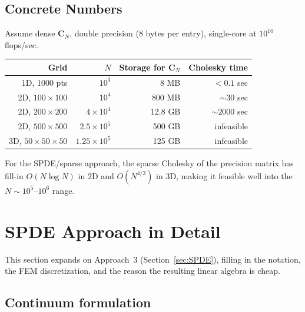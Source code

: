 \documentclass[11pt]{article}
\newcommand{\Cov}{\mathbf{C}}
\begin{document}
\subsection{Concrete Numbers}\label{sec:numbers}

Assume dense $\Cov_N$, double precision (8 bytes per entry), single-core at $10^{10}$ flops/sec.

\begin{center}
\renewcommand{\arraystretch}{1.3}
\begin{tabular}{@{}rrrr@{}}
\toprule
\textbf{Grid} & $N$ & \textbf{Storage for $\Cov_N$} & \textbf{Cholesky time} \\
\midrule
1D, 1000 pts & $10^3$ & 8 MB & $< 0.1$ sec \\
2D, $100\times 100$ & $10^4$ & 800 MB & $\sim 30$ sec \\
2D, $200\times 200$ & $4\times 10^4$ & 12.8 GB & $\sim 2000$ sec \\
2D, $500\times 500$ & $2.5\times 10^5$ & 500 GB & infeasible \\
3D, $50\times 50\times 50$ & $1.25\times 10^5$ & 125 GB & infeasible \\
\bottomrule
\end{tabular}
\end{center}

For the SPDE/sparse approach, the sparse Cholesky of the precision matrix has fill-in $O(N \log N)$ in 2D and $O(N^{4/3})$ in 3D, making it feasible well into the $N \sim 10^5$--$10^6$ range.


\section{SPDE Approach in Detail}\label{sec:SPDE_detail}

This section expands on Approach~3 (Section~\ref{sec:SPDE}), filling in the notation, the FEM discretization, and the reason the resulting linear algebra is cheap.

\subsection{Continuum formulation}\label{sec:SPDE_cont}
\end{document}

